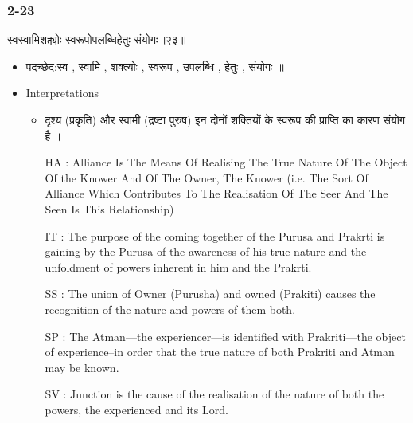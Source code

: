 \begin{frame}[fragile]\frametitle{2-23}
\begin{sanskrit}
स्वस्वामिशक्त्योः स्वरूपोपलब्धिहेतुः संयोगः॥२३॥
\end{sanskrit}

	\begin{itemize}
	\item पदच्छेद:स्व , स्वामि , शक्त्योः , स्वरूप , उपलब्धि , हेतुः , संयोगः ॥
	\item Interpretations
		\begin{itemize}
		\item दृश्य (प्रकृति) और स्वामी (द्रष्टा पुरुष) इन दोनों शक्तियों के स्वरूप की प्राप्ति का कारण संयोग है ।
		\item [HA]: Alliance Is The Means Of Realising The True Nature Of The Object Of the Knower And Of The Owner, The Knower (i.e. The Sort Of Alliance Which Contributes To The Realisation Of The Seer And The Seen Is This Relationship)
		\item [IT]: The purpose of the coming together of the Purusa and Prakrti is gaining by the Purusa of the awareness of his true nature and the unfoldment of powers inherent in him and the Prakrti.
		\item [SS]: The union of Owner (Purusha) and owned (Prakiti) causes the recognition of the nature and powers of them both.
		\item [SP]: The Atman—the experiencer—is identified with Prakriti—the object of experience–in order that the true nature of both Prakriti and Atman may be known.
		\item [SV]: Junction is the cause of the realisation of the nature of both the powers, the experienced and its Lord. 
		\end{itemize}
	\end{itemize}
	
\end{frame}

